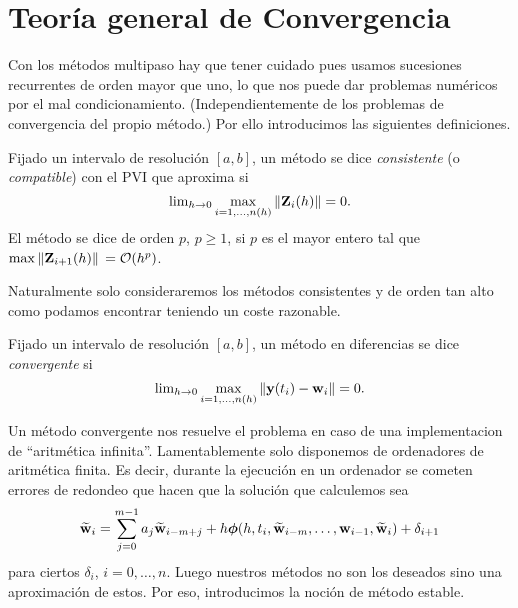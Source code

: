 \section{Teoría general de Convergencia}

Con los métodos multipaso hay que tener cuidado pues usamos
sucesiones recurrentes de orden mayor que uno,
lo que nos puede dar problemas numéricos
por el mal condicionamiento.
(Independientemente de los problemas de convergencia del propio método.)
Por ello introducimos las siguientes definiciones.

\begin{definition}
    Fijado un intervalo de resolución $[a, b]$,
    un método se dice \emph{consistente} (o \emph{compatible})
    con el PVI que aproxima si
    \begin{equation*}
        \lim\nolimits_{h\to 0} \max_{i = 1,\ldots,n(h)}{\norm{\vb{Z}{}_i(h)}} = 0.
	\end{equation*}
	El método se dice de orden $p$, $p \geq 1$, si $p$ es el mayor entero
	tal que $\max{\norm*{\vb{Z}{}_{i+1}(h)}} = \vb{\mathcal{O}}{}(h^p)$.
\end{definition}

Naturalmente solo consideraremos los métodos consistentes y de orden tan
alto como podamos encontrar teniendo un coste razonable.

\begin{definition}
    Fijado un intervalo de resolución $[a, b]$,
    un método en diferencias se dice \emph{convergente} si
    \begin{equation*}
        \lim\nolimits_{h \to 0}
            \max_{i = 1,\ldots,n(h)}{\norm{\vb{y}{}(t_i)-\vb{w}{}_i}} = 0.
    \end{equation*}
\end{definition}

Un método convergente nos resuelve el problema en caso de una
implementacion de ``aritmética infinita''.
Lamentablemente solo disponemos de ordenadores de aritmética finita.
Es decir, durante la ejecución en un ordenador se cometen errores de redondeo
que hacen que la solución que calculemos sea
\begin{equation*}
    \vb{\widetilde{w}}{}_i = \sum_{j=0}^{m-1} {a_j\vb{\widetilde{w}}{}_{i-m+j}}
        + h\vb*{\phi}{}(h, t_i, \vb{\widetilde{w}}{}_{i-m}, \dots, \vb{w}{}_{i-1}, \vb{\widetilde{w}}{}_i) + \delta_{i+1}
\end{equation*}
para ciertos $\delta_i$, $i = 0,\ldots,n$.
Luego nuestros métodos no son los deseados sino una aproximación de estos.
Por eso, introducimos la noción de método estable.

